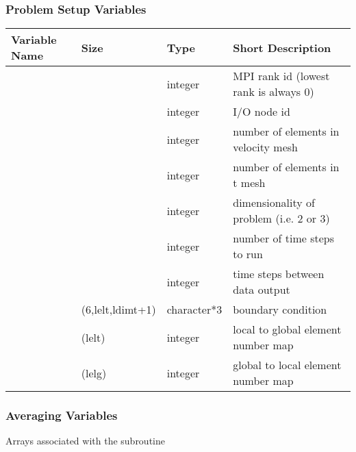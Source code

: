 \documentclass[letterpaper,10pt,english]{sphinxmanual}
\begin{document}
\subsubsection{Problem Setup Variables}
\label{\detokenize{appendix:problem-setup-variables}}

\begin{savenotes}\sphinxattablestart
\centering
\begin{tabulary}{\linewidth}[t]{|T|T|T|T|}
\hline
\sphinxstyletheadfamily 
Variable Name
&\sphinxstyletheadfamily 
Size
&\sphinxstyletheadfamily 
Type
&\sphinxstyletheadfamily 
Short Description
\\
\hline
{}
&
\textendash{}
&
integer
&
MPI rank id (lowest rank is always 0)
\\
\hline
{}
&
\textendash{}
&
integer
&
I/O node id
\\
\hline
{}
&
\textendash{}
&
integer
&
number of elements in velocity mesh
\\
\hline
{}
&
\textendash{}
&
integer
&
number of elements in t mesh
\\
\hline
{}
&
\textendash{}
&
integer
&
dimensionality of problem (i.e. 2 or 3)
\\
\hline
{}
&
\textendash{}
&
integer
&
number of time steps to run
\\
\hline
{}
&
\textendash{}
&
integer
&
time steps between data output
\\
\hline
{}
&
(6,lelt,ldimt+1)
&
character*3
&
boundary condition
\\
\hline
{}
&
(lelt)
&
integer
&
local to global element number map
\\
\hline
{}
&
(lelg)
&
integer
&
global to local element number map
\\
\hline
\end{tabulary}
\par
\sphinxattableend\end{savenotes}


\subsubsection{Averaging Variables}
\label{\detokenize{appendix:averaging-variables}}
Arrays associated with the  subroutine
\end{document}
